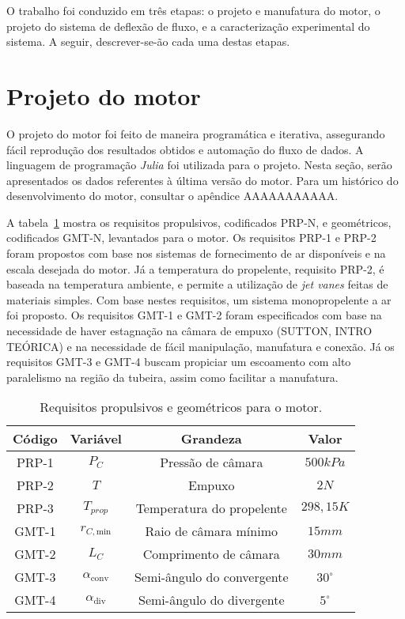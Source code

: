 
O trabalho foi conduzido em três etapas: o projeto e manufatura do motor, o projeto do sistema de deflexão de fluxo, e a caracterização experimental do sistema. A seguir, descrever-se-ão cada uma destas etapas.

\section{Projeto do motor}

O projeto do motor foi feito de maneira programática e iterativa, assegurando fácil reprodução dos resultados obtidos e automação do fluxo de dados. A linguagem de programação \textit{Julia} foi utilizada para o projeto. Nesta seção, serão apresentados os dados referentes à última versão do motor. Para um histórico do desenvolvimento do motor, consultar o apêndice AAAAAAAAAAA. 

A tabela~\ref{tab:requirements} mostra os requisitos propulsivos, codificados PRP-N, e geométricos, codificados GMT-N, levantados para o motor. Os requisitos PRP-1 e PRP-2 foram propostos com base nos sistemas de fornecimento de ar disponíveis e na escala desejada do motor. Já a temperatura do propelente, requisito PRP-2, é baseada na temperatura ambiente, e permite a utilização de \textit{jet vanes} feitas de materiais simples. Com base nestes requisitos, um sistema monopropelente a ar foi proposto. Os requisitos GMT-1 e GMT-2 foram especificados com base na necessidade de haver estagnação na câmara de empuxo (SUTTON, INTRO TEÓRICA) e na necessidade de fácil manipulação, manufatura e conexão. Já os requisitos GMT-3 e GMT-4 buscam propiciar um escoamento com alto paralelismo na região da tubeira, assim como facilitar a manufatura.

\begin{table}[]
    \centering\begin{tabular}{cccc} \toprule
        Código & Variável & Grandeza & Valor \\ \midrule
        PRP-1 & \(P_C\) & Pressão de câmara & \(500kPa\) \\
        PRP-2 & \(T\) & Empuxo & \(2N\) \\
        PRP-3 &\(T_{prop}\) & Temperatura do propelente & \(298,15K\) \\
        GMT-1 & \(r_{C,\text{min}}\) & Raio de câmara mínimo & \(15mm\) \\
        GMT-2 & \(L_C\) & Comprimento de câmara & \(30mm\) \\
        GMT-3 & \(\alpha_{\text{conv}}\) & Semi-ângulo do convergente & \(30^\circ \) \\
        GMT-4 & \(\alpha_{\text{div}}\) & Semi-ângulo do divergente & \(5^\circ \) \\ \bottomrule 
    \end{tabular}
    \caption{Requisitos propulsivos e geométricos para o motor.}
    \label{tab:requirements}
\end{table}

